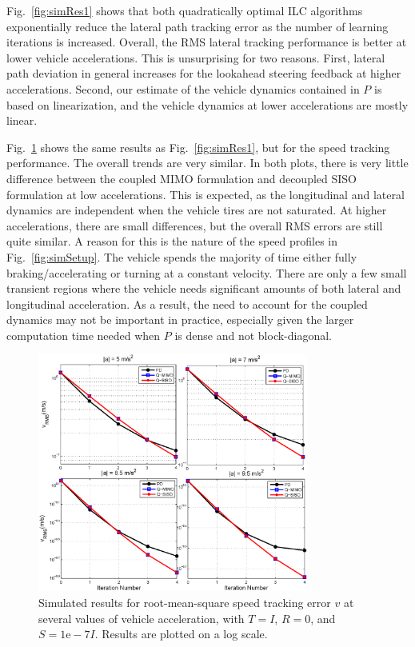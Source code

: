 \documentclass[9pt,shortpaper,twoside,web]{ieeecolor}
\begin{document}
{{{Fig.~\ref{fig:simRes1} shows that both quadratically optimal ILC algorithms exponentially reduce the lateral
path tracking error as the number of learning iterations is increased. Overall, the RMS lateral tracking performance is
better at lower vehicle accelerations. This is unsurprising for two reasons. First, lateral path deviation in general increases for the lookahead steering feedback at higher accelerations. Second, our estimate of the vehicle dynamics contained in $P$
is based on linearization, and the vehicle dynamics at lower accelerations are mostly linear.

Fig.~\ref{fig:simRes2} shows the same results as Fig.~\ref{fig:simRes1}, but for the speed tracking performance. 
The overall trends are very similar. In both plots, there is very little difference between the coupled MIMO formulation and decoupled SISO 
formulation at low accelerations. This is expected, as the longitudinal and lateral dynamics are independent when the vehicle tires are not saturated.
At higher accelerations, there are small differences, but the overall RMS errors are still quite similar. A reason for this is the
nature of the speed profiles in Fig.~\ref{fig:simSetup}. The vehicle spends the majority of time either fully braking/accelerating or
turning at a constant velocity. There are only a few small transient regions where the vehicle needs significant amounts of both 
lateral and longitudinal acceleration. As a result, the need to account for the coupled dynamics may not be important in practice, especially
given the larger computation time needed when $P$ is dense and not block-diagonal.     

\begin{figure}[tb]
\centering
\includegraphics[width=3.5in]{figures/simRes2.eps}
\caption[Simulated results for root-mean-square speed tracking error $v$ at several values of vehicle acceleration.]{Simulated results for root-mean-square speed tracking error $v$ at several values of vehicle acceleration, with $T = I$, $R = 0$, and $S = \mathrm{1e-7} I$.
Results are plotted on a log scale.}
\label{fig:simRes2}
\end{figure}

}}}
\end{document}
